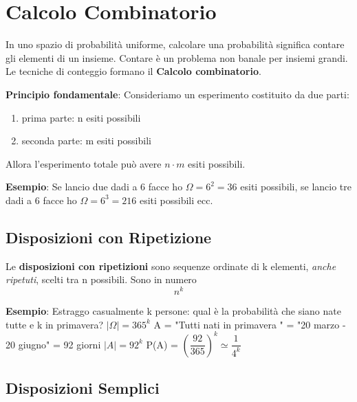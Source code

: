 \newpage
\section{Calcolo Combinatorio}

In uno spazio di probabilità uniforme, calcolare una probabilità significa contare gli elementi di un insieme.  Contare è un problema non banale per insiemi grandi. Le tecniche di conteggio formano il \textbf{Calcolo combinatorio}.\newline

\noindent \textbf{Principio fondamentale}: Consideriamo un esperimento costituito da due parti:
\begin{enumerate}
    \item prima parte: n esiti possibili
    \item seconda parte: m esiti possibili
\end{enumerate}
Allora l'esperimento totale può avere $\mathit{n \cdot m}$ esiti possibili. \newline

\begin{tcolorbox}
    \textbf{Esempio}: Se lancio due dadi a 6 facce ho $\Omega = 6^2 = 36$ esiti possibili, se lancio tre dadi a 6 facce ho $\Omega = 6^3 = 216$ esiti possibili ecc.
\end{tcolorbox} 

\subsection{Disposizioni con Ripetizione}

Le \textbf{disposizioni con ripetizioni} sono sequenze ordinate di k elementi, \textit{anche ripetuti}, scelti tra n possibili. Sono in numero $$n^k$$ 

\begin{tcolorbox}
    \textbf{Esempio}: Estraggo casualmente k persone: qual è la probabilità che siano nate tutte e k in primavera? \newline
    $ |\Omega| = 365^k$ \newline
    A = "Tutti nati in primavera " = "20 marzo - 20 giugno" = 92 giorni \newline
    $|A| = 92^k$ \newline
    P(A) = $(\dfrac{92}{365})^k \simeq \dfrac{1}{4^k} $ \newline
\end{tcolorbox} 
    

\subsection{Disposizioni Semplici}

